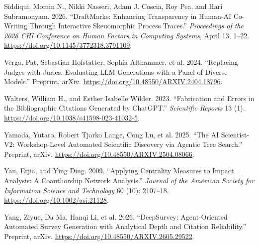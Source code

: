 \documentclass[
]{article}
\newlength{\cslhangindent}
\newenvironment{CSLReferences}[2] %
 {\begin{list}{}{%
  \setlength{\itemindent}{0pt}
  \setlength{\leftmargin}{0pt}
  \setlength{\parsep}{0pt}
  \ifodd #1
   \setlength{\leftmargin}{\cslhangindent}
   \setlength{\itemindent}{-1\cslhangindent}
  \fi
  \setlength{\itemsep}{#2\baselineskip}}}
 {\end{list}}
\begin{document}
\begin{CSLReferences}{1}{1}
Siddiqui, Momin N., Nikki Nasseri, Adam J. Coscia, Roy Pea, and Hari
Subramonyam. 2026. {``DraftMarks: Enhancing Transparency in Human-AI
Co-Writing Through Interactive Skeuomorphic Process Traces.''}
\emph{Proceedings of the 2026 CHI Conference on Human Factors in
Computing Systems}, April 13, 1--22.
\url{https://doi.org/10.1145/3772318.3791109}.

Verga, Pat, Sebastian Hofstatter, Sophia Althammer, et al. 2024.
{``Replacing Judges with Juries: Evaluating LLM Generations with a Panel
of Diverse Models.''} Preprint, arXiv.
\url{https://doi.org/10.48550/ARXIV.2404.18796}.

Walters, William H., and Esther Isabelle Wilder. 2023. {``Fabrication
and Errors in the Bibliographic Citations Generated by ChatGPT.''}
\emph{Scientific Reports} 13 (1).
\url{https://doi.org/10.1038/s41598-023-41032-5}.

Yamada, Yutaro, Robert Tjarko Lange, Cong Lu, et al. 2025. {``The AI
Scientist-V2: Workshop-Level Automated Scientific Discovery via Agentic
Tree Search.''} Preprint, arXiv.
\url{https://doi.org/10.48550/ARXIV.2504.08066}.

Yan, Erjia, and Ying Ding. 2009. {``Applying Centrality Measures to
Impact Analysis: A Coauthorship Network Analysis.''} \emph{Journal of
the American Society for Information Science and Technology} 60 (10):
2107--18. \url{https://doi.org/10.1002/asi.21128}.

Yang, Ziyue, Da Ma, Hanqi Li, et al. 2026. {``DeepSurvey: Agent-Oriented
Automated Survey Generation with Analytical Depth and Citation
Reliability.''} Preprint, arXiv.
\url{https://doi.org/10.48550/ARXIV.2605.29522}.

\end{CSLReferences}
\end{document}
